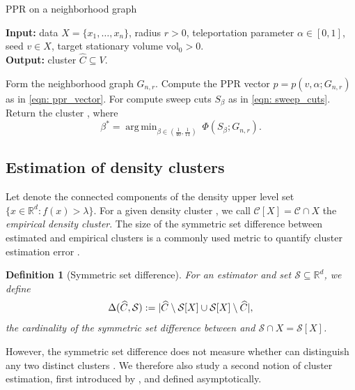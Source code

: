 \documentclass[11pt,twoside]{article}
\newtheorem{definition}{Definition}
\DeclarePairedDelimiter\abs{\lvert}{\rvert}
\newcommand{\vol}{\mathrm{vol}}
\newcommand{\Reals}{\mathbb{R}}
\newcommand{\Rd}{\Reals^d}
\newcommand{\1}{\mathbf{1}}
\newcommand{\pbf}{p}        %
\newcommand{\Xbf}{X}             %
\newcommand{\Cbb}{\mathbb{C}}
\newcommand{\Cset}{\mathcal{C}}
\newcommand{\Cest}{\widehat{C}}
\DeclareMathOperator*{\argmin}{arg\,min}
\begin{document}
\begin{algorithm}
\caption{PPR on a neighborhood graph}
\label{alg: ppr}	
{\bfseries Input:} data $\Xbf=\{x_1,\ldots,x_n\}$, radius $r > 0$, teleportation
parameter $\alpha \in [0,1]$, seed $v \in \Xbf$, target stationary volume
$\vol_0 > 0$. \\     
{\bfseries Output:} cluster $\Cest \subseteq V$.
\begin{algorithmic}[1]
  \STATE Form the neighborhood graph $G_{n,r}$.
  \STATE Compute the PPR vector $p=\pbf(v, \alpha; G_{n,r})$ as in \eqref{eqn: 
    ppr_vector}. 
  \STATE For  compute sweep cuts 
  $S_{\beta}$ as in \eqref{eqn: sweep_cuts}.
  \STATE Return the cluster \smash{$\Cest = S_{\beta^*}$}, where  
  $$
  \beta^* = \argmin_{\beta \in (\frac{1}{40}, \frac{1}{11})}~ \Phi(S_{\beta}; G_{n,r}).
  $$
\end{algorithmic}
\end{algorithm}

\subsection{Estimation of density clusters} 
Let \smash{$\Cbb_f(\lambda)$} denote 
the connected components of the density upper level set $\{x \in \Rd: f(x) >
\lambda\}$.  For a given density cluster \smash{$\Cset \in \Cbb_f(\lambda)$}, we
call $\Cset[\Xbf] = \Cset \cap \Xbf$ the \emph{empirical density cluster}. The
size of the symmetric set difference between estimated and empirical clusters is 
a commonly used metric to quantify cluster estimation error
\citep{korostelev1993,polonik1995,rigollet2009}.  

\begin{definition}[Symmetric set difference]
  \label{def: symmetric_set_diff}
  For an estimator \smash{$\Cest \subseteq \Xbf$} and set
  $\mathcal{S} \subseteq \Reals^d$, we define   
  \begin{equation}
    \label{eqn: misclassification_rate}
    \Delta(\Cest, \mathcal{S}) := \abs{\Cest \setminus \mathcal{S}[\Xbf] \cup
      \mathcal{S}[\Xbf] \setminus \Cest},
  \end{equation}
  the cardinality of the symmetric set difference between 
  \smash{$\Cest$} and $\mathcal{S} \cap \Xbf = \mathcal{S}[\Xbf]$. 
\end{definition}

However, the symmetric set difference does not measure whether \smash{$\Cest$} 
can distinguish any two distinct clusters \smash{$\Cset,\Cset' \in
  \Cbb_f(\lambda)$}. We therefore also study a second notion of cluster
estimation, first introduced by \citet{hartigan1981}, and defined
asymptotically. 
\end{document}
